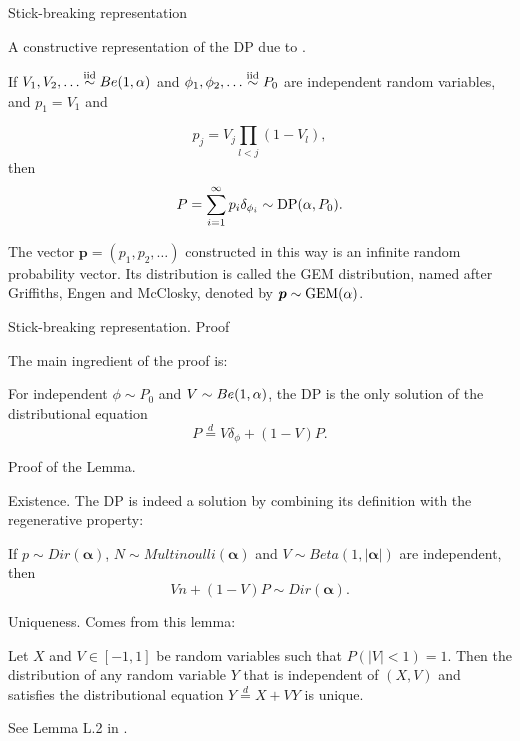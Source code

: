 \begin{frame}{Stick-breaking representation}

A \alert{constructive representation} of the DP due to \citet{sethuraman1994constructive}.
\begin{theorem}\label{theorem:sethuraman}
If $V_1, V_2, \ldots \stackrel{\mbox{\scriptsize{iid}}}{\sim} Be(1, \alpha)$ and $\phi_1, \phi_2, \ldots \stackrel{\mbox{\scriptsize{iid}}}{\sim} P_0$ are independent random variables, and $p_1=V_1$ and 

$$
p_j=V_j \prod_{l < j}(1-V_l),
$$ 
then 
$$
P=\sum_{i=1}^\infty p_i\delta_{\phi_i}\sim \text{DP}(\alpha, P_0).
$$
\end{theorem}

The vector $\boldsymbol p = (p_1,p_2,\ldots)$ constructed in this way is an infinite random probability vector. Its distribution is called the \alert{GEM distribution}, named after Griffiths, Engen and McClosky, denoted by $\boldsymbol p \sim\text{GEM}(\alpha)$.


\end{frame}

\begin{frame}{Stick-breaking representation. Proof}

The main ingredient of the proof is:

\begin{lemma}
For independent $\phi\sim P_0$ and $V\sim Be(1,\alpha)$, the DP is the only solution of the distributional equation 
\begin{equation*}\label{Dir:distributional_equation}
    P \overset{d}{=} V\delta_\phi + (1-V)P. 
\end{equation*}
\end{lemma}

\pause

\alert{Proof of the Lemma.}


\alert{Existence.} The DP is indeed a solution by combining its definition with the regenerative property:

If $p\sim Dir(\boldsymbol\alpha)$, $N\sim Multinoulli(\boldsymbol\alpha)$ and $V\sim Beta(1,|\boldsymbol\alpha|)$ are independent, then 
$$Vn+(1-V)P \sim Dir(\boldsymbol\alpha).$$

\alert{Uniqueness.} Comes from this lemma:

\begin{lemma}
Let $X$ and $V\in [-1, 1]$ be random variables such that $P(|V|<1) = 1$. Then the distribution of any random variable $Y$ that is independent of $(X, V)$ and satisfies the distributional equation $Y \overset{d}{=} X + VY$ is unique.
\end{lemma}
See Lemma L.2 in \cite{ghosal2017fundamentals}.


\end{frame}

